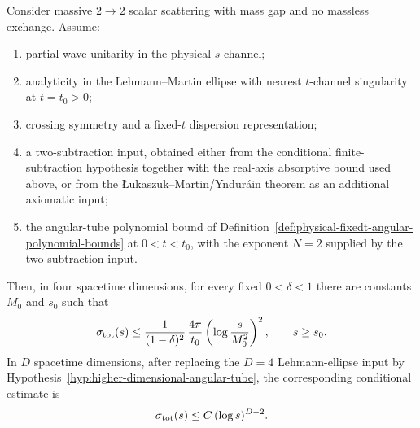 \begin{theorem}
\label{thm:froissart-martin-bound}
Consider massive \(2\to2\) scalar scattering with mass gap and no massless
exchange.  Assume:
\begin{enumerate}
  \item partial-wave unitarity in the physical \(s\)-channel;
  \item analyticity in the Lehmann--Martin ellipse with nearest
  \(t\)-channel singularity at \(t=t_0>0\);
  \item crossing symmetry and a fixed-\(t\) dispersion representation;
  \item a two-subtraction input, obtained either from the conditional
  finite-subtraction hypothesis together with the real-axis absorptive bound
  used above, or from the \L{}ukaszuk--Martin/Yndur\'ain theorem as an
  additional axiomatic input;
  \item the angular-tube polynomial bound of
  Definition~\ref{def:physical-fixedt-angular-polynomial-bounds} at
  \(0<t<t_0\), with the exponent \(N=2\) supplied by the two-subtraction
  input.
\end{enumerate}
Then, in four spacetime dimensions, for every fixed \(0<\delta<1\) there are
constants \(M_0\) and \(s_0\) such that
\begin{equation}
  \sigma_{\rm tot}(s)
  \le
  \frac{1}{(1-\delta)^2}\,
  \frac{4\pi}{t_0}
  \left(\log\frac{s}{M_0^2}\right)^2,
  \qquad s\ge s_0 .
  \label{eq:froissart-martin-four-dimensional-bound}
\end{equation}
In \(D\) spacetime dimensions, after replacing the \(D=4\) Lehmann-ellipse
input by Hypothesis~\ref{hyp:higher-dimensional-angular-tube}, the
corresponding conditional estimate is
\begin{equation}
  \sigma_{\rm tot}(s)\le C\,(\log s)^{D-2}.
  \label{eq:froissart-martin-d-dimensional-bound}
\end{equation}
\end{theorem}

